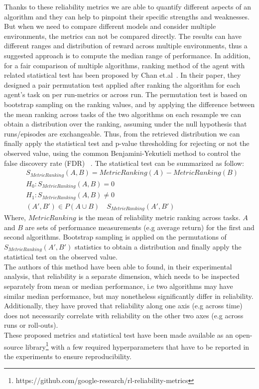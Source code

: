 \documentclass{article}
\begin{document}
Thanks to these reliability metrics we are able to quantify different aspects of an algorithm and they can help to pinpoint their specific strengths and weaknesses. But when we need to compare different models and consider multiple environments, the metrics can not be compared directly.
The results can have different ranges and distribution of reward across multiple environments, thus a suggested approach is to compute the median range of performance. In addition, for a fair comparison of multiple algorithms, ranking method of the agent with related statistical test has been proposed by Chan et.al~\cite{GoogleMeasure}. In their paper, they designed a pair permutation test applied after ranking the algorithm for each agent's task on per run-metrics or across run. The permutation test is based on bootstrap sampling on the ranking values, and by applying the difference between the mean ranking across tasks of the two algorithms on each resample we can obtain a distribution over the ranking, assuming under the null hypothesis that runs/episodes are exchangeable. Thus, from the retrieved distribution we can finally apply the statistical test and p-value thresholding for rejecting or not the observed value, using the common Benjamini-Yekutieli method to control the false discovery rate (FDR) ~\cite{FDR}. The statistical test can be summarized as follow:
\begin{equation}
\begin{split}
	&S_{MetricRanking}(A, B) = MetricRanking (A) - MetricRanking (B) \\
	&H_0 : S_{MetricRanking}(A, B) =  0 \\
	&H_1 : S_{MetricRanking}(A, B) \neq  0 \\
	&(A', B')\in P (A \cup B) \quad S_{MetricRanking}(A', B')
\end{split}
\end{equation}
Where, $MetricRanking$ is the mean of reliability metric ranking across tasks. $A$ and $B$ are sets of performance measurements (e.g average return) for the first and second algorithms. Bootstrap sampling is applied on the permutations of $ S_{MetricRanking}(A', B')$ statistics to obtain a distribution and finally apply the statistical test on the observed value.\\
The authors of this method have been able to found, in their experimental analysis, that reliability is a separate dimension, which needs to be inspected separately from mean or median performance, i.e two algorithms may have similar median performance, but may nonetheless significantly differ in reliability. Additionally, they have proved that reliability along one axis (e.g across time) does not necessarily correlate with reliability on the other two axes (e.g across runs or roll-outs).\\
These proposed metrics and statistical test have been made available as an open-source library\footnote{https://github.com/google-research/rl-reliability-metrics} with a few required hyperparameters that have to be reported in the experiments to ensure reproducibility.
\label{gen_inst}
\end{document}
